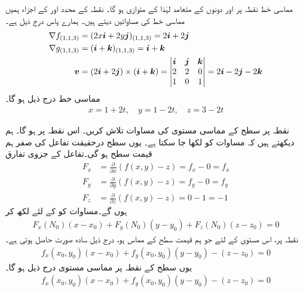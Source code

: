 مماسی خط نقطہ  پر   اور  دونوں کے متعامد لہٰذا  کے  متوازی ہو گا۔ نقطہ  کے محدد اور   کے اجزاء ہمیں  مماسی  خط کی مساواتیں  دیتے ہیں۔ ہمارے پاس درج ذیل ہے۔
\begin{align*}
\nabla f_{(1,1,3)}&=(2x{\boldsymbol{i}}+2y{\boldsymbol{j}})_{(1,1,3)}=2{\boldsymbol{i}}+2{\boldsymbol{j}}\\
\nabla g_{(1,1,3)}&=({\boldsymbol{i}}+{\boldsymbol{k}})_{(1,1,3)}={\boldsymbol{i}}+{\boldsymbol{k}}\\
{{\boldsymbol{v}}}&=(2{\boldsymbol{i}}+2{\boldsymbol{j}})\times ({\boldsymbol{i}}+{\boldsymbol{k}})=\begin{vmatrix}{\boldsymbol{i}}&{\boldsymbol{j}}&{\boldsymbol{k}}\\ 2&2&0\\ 1&0&1  \end{vmatrix}=2{\boldsymbol{i}}-2{\boldsymbol{j}}-2{\boldsymbol{k}}
\end{align*}
مماسی خط درج ذیل ہو گا۔
\begin{align*}
x=1+2t,\quad y=1-2t,\quad z=3-2t
\end{align*}

نقطہ  پر     سطح   کے مماسی مستوی کی مساوات تلاش کریں۔ اس نقطہ پر    ہو گا۔ ہم دیکھتے ہیں کہ مساوات   کو  لکھا  جا سکتا ہے۔ یوں سطح   درحقیقت تفاعل  کی صفر ہم قیمت سطح  ہو گی۔تفاعل   کے جزوی تفارق
\begin{align*}
F_x&=\frac{\partial}{\partial x}(f(x,y)-z)=f_x-0=f_x\\
F_y&=\frac{\partial}{\partial y}(f(x,y)-z)=f_y-0=f_y\\
F_z&=\frac{\partial}{\partial z}(f(x,y)-z)=0-1=-1
\end{align*}
ہوں گے۔مساوات     کو  کے لئے لکھ کر
\begin{align*}
F_x(N_0)(x-x_0)+F_y(N_0)(y-y_0)+F_z(N_0)(z-z_0)=0
\end{align*}
نقطہ  پر،  اس مستوی کے لئے جو  ہم قیمت سطح کے   مماس ہو،   درج ذیل سادہ  صورت  حاصل  ہوتی ہے۔
\begin{align*}
f_x(x_0,y_0)(x-x_0)+f_y(x_0,y_0)(y-y_0)-(z-z_0)=0
\end{align*}
یوں  سطح  کے نقطہ  پر  مماسی مستوی درج ذیل ہو گا۔
\begin{align}\label{مساوات_کثیرالمتغیر_مماسی_مستوی}
f_x(x_0,y_0)(x-x_0)+f_y(x_0,y_0)(y-y_0)-(z-z_0)=0
\end{align}


